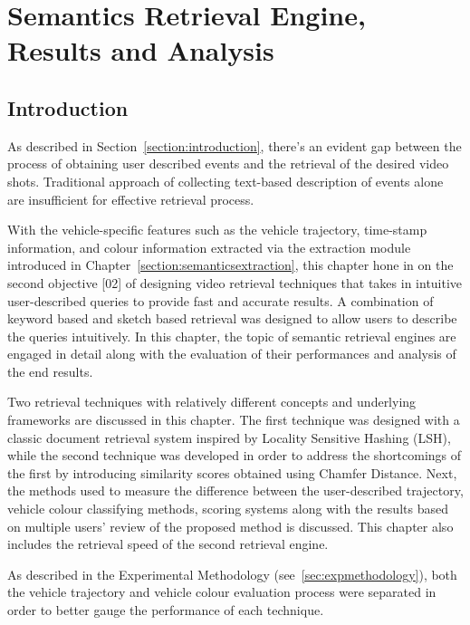 
\chapter{Semantics Retrieval Engine, Results and Analysis}

\label{section:retrievalengine}
\section{Introduction}

As described in Section~\ref{section:introduction}, there's an evident gap between the process of obtaining user described events and the retrieval of the desired video shots. Traditional approach of collecting text-based description of events alone are insufficient for effective retrieval process.

With the vehicle-specific features such as the vehicle trajectory, time-stamp information, and colour information extracted via the extraction module introduced in Chapter~\ref{section:semanticsextraction},
this chapter hone in on the second objective [02] of designing video retrieval techniques that takes in intuitive user-described queries to provide fast and accurate results.
A combination of keyword based and sketch based retrieval was designed to allow users to describe the queries intuitively.
In this chapter, the topic of semantic retrieval engines are engaged in detail along with the evaluation of their performances and analysis of the end results.

Two retrieval techniques with relatively different concepts and underlying frameworks are discussed in this chapter. The first technique was designed with a classic document retrieval system inspired by Locality Sensitive Hashing (LSH), while the second technique was developed in order to address the shortcomings of the first by introducing similarity scores obtained using Chamfer Distance.
Next, the methods used to measure the difference between the user-described trajectory, vehicle colour classifying methods, scoring systems along with the results based on multiple users' review of the proposed method is discussed. This chapter also includes the retrieval speed of the second retrieval engine.

As described in the Experimental Methodology (see~\ref{sec:expmethodology}), both the vehicle trajectory and vehicle colour evaluation process were separated in order to better gauge the performance of each technique.

